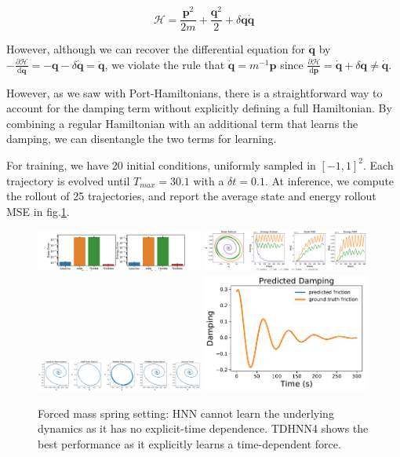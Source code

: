 \documentclass[twoside]{article}
\begin{document}
\begin{equation}
\mathcal{H} =\frac{ \mathbf{p}^2}{2m} + \frac{\mathbf{q}^2}{2} + \delta \mathbf{q} \dot{\mathbf{q}}
\end{equation}

However, although we can recover the differential equation for $\ddot{\mathbf{q}}$ by $-\frac{\partial\mathcal{H}}{\mathrm{d}\mathbf{q}}  =-\mathbf{q} - \delta\dot{\mathbf{q}} = \ddot{\mathbf{q}}$, we violate the rule that $\dot{\mathbf{q}} = m^{-1}\mathbf{p}$ since $ \frac{\partial\mathcal{H}}{\mathrm{d}\mathbf{p}} =  \dot{\mathbf{q}} +\delta \mathbf{q} \neq \dot{\mathbf{q}} $.


However, as we saw with Port-Hamiltonians, there is a straightforward way to account for the damping term without explicitly defining a full Hamiltonian. By combining a regular Hamiltonian with an additional term that learns the damping, we can disentangle the two terms for learning.

For training, we have 20 initial conditions, uniformly sampled in $[-1,1]^2$. Each trajectory is evolved until $T_{max} = 30.1$ with a $\delta t = 0.1$. At inference, we compute the rollout of 25 trajectories, and report the average state and energy rollout MSE in fig.\ref{damped}.

\begin{figure}[h!]
\centering
\includegraphics[width=0.49\textwidth]{figures/damped_1_errors.pdf}
\includegraphics[width=0.49\textwidth]{figures/damped_1_pred.pdf}
\includegraphics[width=0.49\textwidth]{figures/damped_rollout.pdf}
\includegraphics[width=0.49\textwidth]{figures/TDHNN4_damped_1.pdf}
\caption{Forced mass spring setting: HNN cannot learn the underlying dynamics as it has no explicit-time dependence. TDHNN4 shows the best performance as it explicitly learns a time-dependent force.}
\label{damped}
\end{figure}
\end{document}
